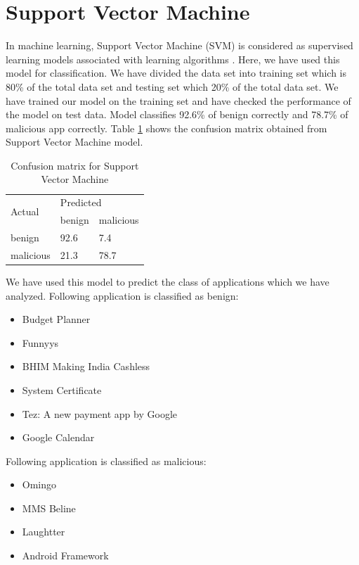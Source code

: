 \section{Support Vector Machine}
In machine learning, Support Vector Machine (SVM) is considered as supervised learning models associated with learning algorithms \cite{wiki:xxx3}. Here, we have used this model for classification. We have divided the data set into training set which is 80\% of the total data set and testing set which 20\% of the total data set. We have trained our model on the training set and have checked the performance of the model on test data. Model classifies 92.6\% of benign correctly and 78.7\% of malicious app correctly. Table \ref{table:tab3} shows the confusion matrix obtained from Support Vector Machine model.
\begin{table}[!h]
\centering

\begin{tabular}{|l||l|l|}
\hline
\multirow{2}{4em}{Actual} & \multicolumn{2}{l|}{Predicted} \\ \cline{2-3} 
                  &    benign      &    malicious       \\ \hline
         benign         &      92.6     &    7.4      \\ \hline
        malicious          &     21.3      &      78.7     \\ \hline
\end{tabular}%
\caption{Confusion matrix for Support Vector Machine}
\label{table:tab3}
\end{table}
We have used this model to predict the class of applications which we have analyzed. Following application is classified as benign:
\begin{itemize}
    \item Budget Planner
    \item Funnyys
    \item BHIM Making India Cashless
    \item System Certificate
    \item Tez: A new payment app by Google
    \item Google Calendar
\end{itemize}
Following application is classified as malicious:
\begin{itemize}
    \item Omingo
    \item MMS Beline
    \item Laughtter
    \item Android Framework
\end{itemize}

